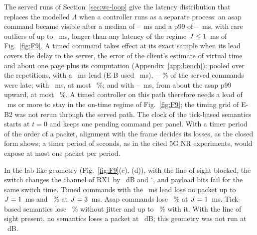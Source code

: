 The served runs of Section~\ref{sec:wc-loop} give the latency distribution
that replaces the modelled $\Lambda$ when a controller runs as a separate process: an asap
command became visible after a median of \numBfourVisPfiftyMinMs--\numBfourVisPfiftyMaxMs~ms
and a p99 of \numBfourVisPninetynineMinMs--\numBfourVisPninetynineMaxMs~ms, with rare outliers
of up to \numBfourVisMaxMs~ms, longer than any latency of the regime
$J\le1$~ms of Fig.~\ref{fig:F9}. A timed command takes effect at its exact
sample when its lead covers the delay to the server, the error of the client's estimate of
virtual time and about one page plus its computation (Appendix~\ref{app:bench}): pooled over
the repetitions, with a \numBfourLeadMinMs~ms lead (E-B used
\numEbLeadMidMs~ms), \numBfourLateTwoMinPct--\numBfourLateTwoMaxPct~\% of the served commands
were late; with
\numBfourLeadOkMs~ms, at most \numBfourLateFourMaxPct~\%; and with
\numBfourLeadSixMs--\numBfourLeadMaxMs~ms, from about the asap p99 upward, at most
\numBfourLateSixMaxPct~\%. A timed controller on this path therefore needs a lead of
\numBfourLeadOkMs~ms or more to stay in the on-time regime of Fig.~\ref{fig:F9}; the timing
grid of E-B2 was not rerun through the served path.
The clock of the tick-based semantics starts at $t=0$ and keeps one pending
command per panel. With a timer period of the order of a packet, alignment with the frame
decides its losses, as the closed form shows; a timer period of seconds, as in the cited
5G NR experiments, would expose at most one packet per period.

In the lab-like geometry (Fig.~\ref{fig:F9}(c), (d)), with the line of
sight blocked, the switch changes the channel of RX1 by
\numEbBlockedChangeDb~dB and \numEbBlockedRotDeg$^\circ$, and \numEbOneErrors{} payload bits
fail for the same switch time. Timed commands with the \numEbLeadMidMs~ms lead lose no packet
up to $J=1$~ms and \numEbTimedTwoPerThreePct~\% at $J=3$~ms.
Asap commands lose \numEbAsapPerOnePct~\% at $J=1$~ms. Tick-based semantics
lose \numEbTickPerZeroPct~\% without jitter and up to \numEbTickPerMaxPct~\% with it. With the
line of sight present, no semantics loses a packet at \numEbEsnoDb~dB; this geometry was not
run at \numEbArcEsnoLowDb~dB.

